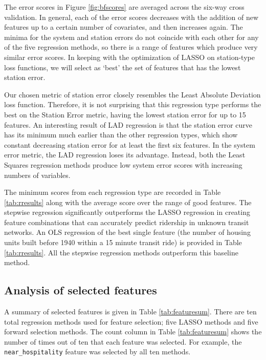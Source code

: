\documentclass[11pt]{article}
\begin{document}
The error scores in Figure \ref{fig:bfscores} are averaged across the six-way cross validation. In general, each of the error scores decreases with the addition of new features up to a certain number of covariates, and then increases again. The minima for the system and station errors do not coincide with each other for any of the five regression methods, so there is a range of features which produce very similar error scores. In keeping with the optimization of LASSO on station-type loss functions, we will select as `best' the set of features that has the lowest station error. 

Our chosen metric of station error closely resembles the Least Absolute Deviation loss function. Therefore, it is not surprising that this regression type performs the best on the Station Error metric, having the lowest station error for up to 15 features. An interesting result of LAD regression is that the station error curve has its minimum much earlier than the other regression types, which show constant decreasing station error for at least the first six features. In the system error metric, the LAD regression loses its advantage. Instead, both the Least Squares regression methods produce low system error scores with increasing numbers of variables. 

The minimum scores from each regression type are recorded in Table \ref{tab:rresults} along with the average score over the range of good features. The stepwise regression significantly outperforms the LASSO regression in creating feature combinations that can accurately predict ridership in unknown transit networks. An OLS regression of the best single feature (the number of housing units built before 1940 within a 15 minute transit ride) is provided in Table \ref{tab:rresults}. All the stepwise regression methods outperform this baseline method. 

\subsection{Analysis of selected features}

A summary of selected features is given in Table \ref{tab:featuresum}. There are ten total regression methods used for feature selection; five LASSO methods and five forward selection methods. The count column in Table \ref{tab:featuresum} shows the number of times out of ten that each feature was selected. For example, the \texttt{near\_hospitality} feature was selected by all ten methods.
\end{document}
